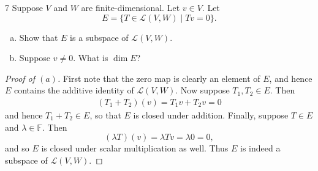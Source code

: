 \documentclass[11pt]{extarticle}
\newenvironment{problem}[1]{\begin{prob*}{#1}{}}{\end{prob*}}
\newcommand{\F}{\mathbb{F}}
\newcommand{\Hom}{\mathcal{L}}
\begin{document}
\begin{problem}{7}
Suppose $V$ and $W$ are finite-dimensional.  Let $v\in V$.  Let 
\begin{equation*}
E = \{T\in \Hom(V,W)\mid Tv = 0\}.
\end{equation*}
\begin{enumerate}[(a)]
\item Show that $E$ is a subspace of $\Hom(V,W)$.
\item Suppose $v\neq 0$.  What is $\dim E$?
\end{enumerate}
\end{problem}
\begin{proof}[Proof of $(a)$]
First note that the zero map is clearly an element of $E$, and hence $E$ contains the additive identity of $\Hom(V,W)$.  Now suppose $T_1,T_2\in E$.  Then 
\begin{align*}
(T_1 + T_2)(v) = T_1v + T_2v = 0
\end{align*}
and hence $T_1 + T_2\in E$, so that $E$ is closed under addition.  Finally, suppose $T\in E$ and $\lambda\in\F$.  Then
\begin{equation*}
(\lambda T)(v) = \lambda Tv = \lambda 0 = 0,
\end{equation*}
and so $E$ is closed under scalar multiplication as well.  Thus $E$ is indeed a subspace of $\Hom(V,W)$.  
\end{proof}
\end{document}
